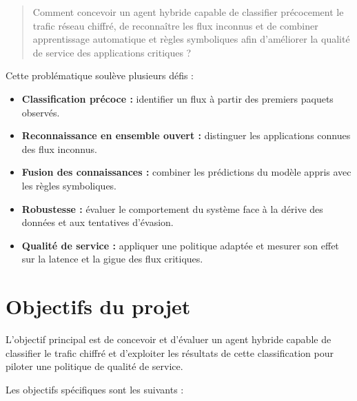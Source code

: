 \begin{quote}
Comment concevoir un agent hybride capable de classifier précocement
le trafic réseau chiffré, de reconnaître les flux inconnus et de
combiner apprentissage automatique et règles symboliques afin
d'améliorer la qualité de service des applications critiques ?
\end{quote}

Cette problématique soulève plusieurs défis :

\begin{itemize}
    \item \textbf{Classification précoce :} identifier un flux à partir
    des premiers paquets observés.
    \item \textbf{Reconnaissance en ensemble ouvert :} distinguer les
    applications connues des flux inconnus.
    \item \textbf{Fusion des connaissances :} combiner les prédictions
    du modèle appris avec les règles symboliques.
    \item \textbf{Robustesse :} évaluer le comportement du système face
    à la dérive des données et aux tentatives d'évasion.
    \item \textbf{Qualité de service :} appliquer une politique adaptée
    et mesurer son effet sur la latence et la gigue des flux critiques.
\end{itemize}

\section{Objectifs du projet}

L'objectif principal est de concevoir et d'évaluer un agent hybride
capable de classifier le trafic chiffré et d'exploiter les résultats
de cette classification pour piloter une politique de qualité de
service.

Les objectifs spécifiques sont les suivants :

